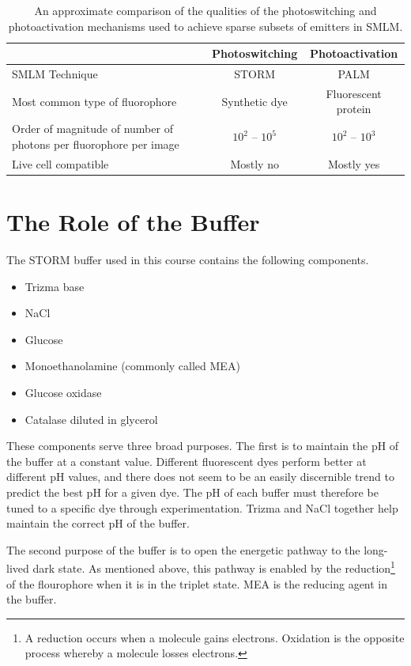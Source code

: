 \documentclass[10pt,a4paper,oneside]{book}
\begin{document}
\begin{table}
    \centering
    \begin{tabular}{ |p{4cm}|c|c| } 
        \hline
        & Photoswitching & Photoactivation \\
        \hline 
        SMLM Technique & STORM & PALM \\
        \hline
        Most common type of fluorophore & Synthetic dye & Fluorescent protein \\
        \hline
        Order of magnitude of number of photons per fluorophore per image & $10^2$ -- $10^5$ & $10^2$ -- $10^3$ \\
        \hline
        Live cell compatible & Mostly no & Mostly yes \\
        \hline
    \end{tabular}
    \caption{An approximate comparison of the qualities of the photoswitching and photoactivation mechanisms used to achieve sparse subsets of emitters in SMLM.}
    \label{table:photophysics-comparison}
\end{table}

\section{The Role of the Buffer}

The STORM buffer used in this course contains the following components.

\begin{itemize}
    \item Trizma base
    \item NaCl
    \item Glucose
    \item Monoethanolamine (commonly called MEA)
    \item Glucose oxidase
    \item Catalase diluted in glycerol
\end{itemize}

These components serve three broad purposes. The first is to maintain the pH of the buffer at a constant value. Different fluorescent dyes perform better at different pH values, and there does not seem to be an easily discernible trend to predict the best pH for a given dye. The pH of each buffer must therefore be tuned to a specific dye through experimentation. Trizma and NaCl together help maintain the correct pH of the buffer.

The second purpose of the buffer is to open the energetic pathway to the long-lived dark state. As mentioned above, this pathway is enabled by the reduction\footnote{A reduction occurs when a molecule gains electrons. Oxidation is the opposite process whereby a molecule losses electrons.} of the flourophore when it is in the triplet state. MEA is the reducing agent in the buffer.
\end{document}

